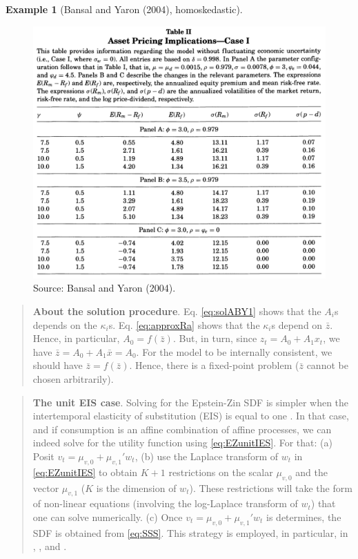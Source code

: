 \documentclass[
  12pt,
]{book}
\theoremstyle{definition}
\theoremstyle{definition}
\newtheorem{example}{Example}[chapter]
\theoremstyle{definition}
\theoremstyle{definition}
\theoremstyle{remark}
\begin{document}
\begin{example}[Bansal and Yaron (2004), homoskedastic]
\begin{figure}

{\centering \includegraphics[width=1\linewidth]{figures/table_BY2} 

}

\caption{Source: Bansal and Yaron (2004).}\label{fig:BY2}
\end{figure}

\end{example}

\begin{quote}
\textbf{About the solution procedure}. Eq. \eqref{eq:solABY1} shows that the \(A_i\)s depends on the \(\kappa_i\)s. Eq. \eqref{eq:approxRa} shows that the \(\kappa_i\)s depend on \(\bar{z}\).
Hence, in particular, \(A_0 = f(\bar{z})\). But, in turn, since \(z_t = A_0 + A_1 x_t\), we have \(\bar{z}=A_0 + A_1 \bar{x}=A_0\). For the model to be internally consistent, we should have \(\bar{z}=f(\bar{z})\). Hence, there is a fixed-point problem (\(\bar{z}\) cannot be chosen arbitrarily).
\end{quote}

\begin{quote}
\textbf{The unit EIS case}. Solving for the Epstein-Zin SDF is simpler when the intertemporal elasticity of substitution (EIS) is equal to one \citep{Piazzesi_Schneider_2007}. In that case, and if consumption is an affine combination of affine processes, we can indeed solve for the utility function using \eqref{eq:EZunitIES}. For that: (a) Posit \(v_t = \mu_{v,0}+\mu_{v,1}'w_t\), (b) use the Laplace transform of \(w_t\) in \eqref{eq:EZunitIES} to obtain \(K+1\) restrictions on the scalar \(\mu_{v,0}\) and the vector \(\mu_{v,1}\) (\(K\) is the dimension of \(w_t\)). These restrictions will take the form of non-linear equations (involving the log-Laplace transform of \(w_t\)) that one can solve numerically. (c) Once \(v_t = \mu_{v,0}+\mu_{v,1}'w_t\) is determines, the SDF is obtained from \eqref{eq:SSS}. This strategy is employed, in particular, in \citet{Gourieroux_Monfort_Mouabbi_Renne_2021}, \citet{Monfort_Pegoraro_Renne_Roussellet_2021}, and \citet{Bletzinger_Lemke_Renne_2024}.
\end{quote}
\end{document}
